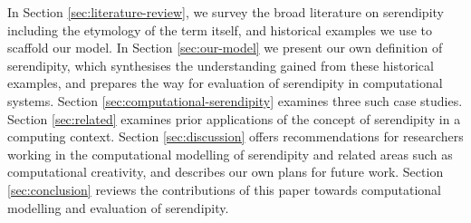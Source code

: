 In Section \ref{sec:literature-review}, we survey the broad literature
on serendipity including the etymology of the term itself, and
historical examples we use to scaffold our model.  In Section
\ref{sec:our-model} we present our own definition of serendipity,
which synthesises the understanding gained from these historical
examples, and prepares the way for evaluation of serendipity in
computational systems.  Section \ref{sec:computational-serendipity}
examines three such case studies.  Section \ref{sec:related} examines
prior applications of the concept of serendipity in a computing
context.  Section \ref{sec:discussion} offers recommendations for
researchers working in the computational modelling of serendipity and
related areas such as computational creativity, and describes our own
plans for future work.  Section \ref{sec:conclusion} reviews the
contributions of this paper towards computational modelling and
evaluation of serendipity.


